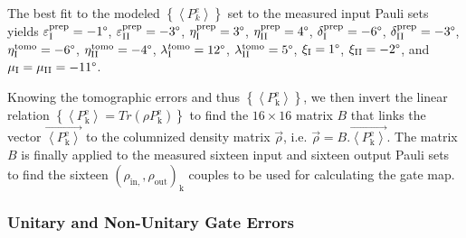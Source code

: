 The best fit to the modeled $\left\{ \left\langle P_{k}^{e}\right\rangle \right\} $
set to the measured input Pauli sets yields $\varepsilon_{\mathrm{I}}^{\mathrm{prep}}=-1\text{\textdegree}$,
$\varepsilon_{\mathrm{II}}^{\mathrm{prep}}=-3\text{\textdegree}$,
$\eta_{\mathrm{I}}^{\mathrm{prep}}=3\text{\textdegree}$, $\mathrm{\eta}_{\mathrm{II}}^{\mathrm{prep}}=4\text{\textdegree}$,
$\delta_{\mathrm{I}}^{\mathrm{prep}}=-6\text{\textdegree}$, $\delta_{\mathrm{II}}^{\mathrm{prep}}=-3\text{\textdegree}$,
$\eta_{\mathrm{I}}^{\mathrm{tomo}}=-6\text{\textdegree}$, $\eta_{\mathrm{II}}^{\mathrm{tomo}}=-4\text{\textdegree}$,
$\lambda_{\mathrm{I}}^{t\mathrm{omo}}=12\text{\textdegree}$, $\lambda_{\mathrm{II}}^{\mathrm{tomo}}=5\text{\textdegree}$,
$\xi_{\mathrm{I}}=1\text{\textdegree}$, $\xi_{\mathrm{II}}=-2\text{\textdegree}$,
and $\mu_{\mathrm{I}}=\mu_{\mathrm{II}}=-11\text{\textdegree}$.

Knowing the tomographic errors and thus $\left\{ \left\langle P_{\mathrm{k}}^{\mathrm{e}}\right\rangle \right\} $,
we then invert the linear relation $\left\{ \left\langle P_{\mathrm{k}}^{\mathrm{e}}\right\rangle =Tr\left(\rho P_{\mathrm{k}}^{\mathrm{e}}\right)\right\} $
to find the $16\times16$ matrix $B$ that links the vector $\overrightarrow{\left\langle P_{\mathrm{k}}^{\mathrm{e}}\right\rangle }$
to the columnized density matrix $\overrightarrow{\rho}$, i.e. $\overrightarrow{\rho}=B.\overrightarrow{\left\langle P_{\mathrm{k}}^{\mathrm{e}}\right\rangle }$.
The matrix $B$ is finally applied to the measured sixteen input and
sixteen output Pauli sets to find the sixteen $(\rho_{\mathrm{in},},\rho_{\mathrm{out}})_{\mathrm{k}}$
couples to be used for calculating the gate map.

\subsubsection{Unitary and Non-Unitary Gate Errors}

